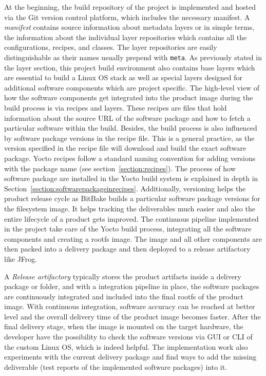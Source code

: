 At the beginning, the build repository of the project is implemented and hosted via the Git version control platform, which includes the necessary manifest. A \emph{manifest} contains source information about metadata layers or in simple terms, the information about the individual layer repositories which contains all the configurations, recipes, and classes. The layer repositories are easily distinguishable as their names usually prepend with \texttt{meta}. As previously stated in the layer section, this project build environment also contains base layers which are essential to build a Linux OS stack as well as special layers designed for additional software components which are project specific. The high-level view of how the software components get integrated into the product image during the build process is via recipes and layers. These recipes are files that hold information about the source \ac{URL} of the software package and how to fetch a particular software within the build. Besides, the build process is also influenced by software package versions in the recipe file. This is a general practice, as the version specified in the recipe file will download and build the exact software package. Yocto recipes follow a standard naming convention for adding versions with the package name (see section~\ref{section:recipes}). The process of how software package are installed in the Yocto build system is explained in depth in Section~\ref{section:softwarepackageinrecipes}. Additionally, versioning helps the product release cycle as BitBake builds a particular software package versions for the filesystem image. It helps tracking the deliverables much easier and also the entire lifecycle of a product gets improved. The continuous pipeline implemented in the project take care of the Yocto build process, integrating all the software components and creating a rootfs image. The image and all other components are then packed into a delivery package and then deployed to a release artifactory like JFrog.

A \emph{Release artifactory} typically stores the product artifacts inside a delivery package or folder, and with a integration pipeline in place, the software packages are continuously integrated and included into the final rootfs of the product image. With continuous integration, software accuracy can be reached at better level and the overall delivery time of the product image becomes faster. After the final delivery stage, when the image is mounted on the target hardware, the developer have the possibility to check the software versions via \ac{GUI} or \ac{CLI} of the custom Linux \ac{OS}, which is indeed helpful. The implementation work also experiments with the current delivery package and find ways to add the missing deliverable (test reports of the implemented software packages) into it.



















